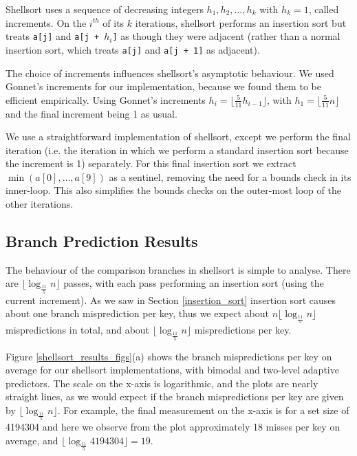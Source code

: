 \documentclass[acmtocl]{acmtrans2m}
\begin{document}
Shellsort uses a sequence of decreasing integers $h_1, h_2, \ldots, h_k$ with
$h_k = 1$, called increments.  On the $i^{th}$ of its $k$ iterations, shellsort
performs an insertion sort but treats \texttt{a[j]} and \texttt{a[j + $h_i$]} as
though they were adjacent (rather than a normal insertion sort, which treats
\texttt{a[j]} and \texttt{a[j + 1]} as adjacent). 

The choice of increments influences shellsort's asymptotic behaviour.  We used
Gonnet's increments \cite{Gonnet+91} for our implementation, because we found
them to be efficient empirically. Using Gonnet's increments $h_i = \lfloor
\frac{5}{11} h_{i - 1} \rfloor$, with $h_1 = \lfloor \frac{5}{11}n \rfloor$ and
the final increment being 1 as usual.

We use a straightforward implementation of shellsort, except we perform the
final iteration (i.e. the iteration in which we perform a standard insertion
sort because the increment is 1) separately.  For this final insertion sort we
extract $\min(a[0], \ldots, a[9])$ as a sentinel, removing the need for a bounds
check in its inner-loop. This also simplifies the bounds checks on the
outer-most loop of the other iterations.

\subsection{Branch Prediction Results}

The behaviour of the comparison branches in shellsort is simple to analyse.
There are $\lfloor \log_\frac{11}{5} n \rfloor$ passes, with each pass
performing an insertion sort (using the current increment). As we saw in Section
\ref{insertion_sort} insertion sort causes about one branch misprediction per
key, thus we expect about $n \lfloor \log_\frac{11}{5}n \rfloor$ mispredictions
in total, and about $\lfloor \log_\frac{11}{5}n \rfloor$ mispredictions per key. 

Figure \ref{shellsort_results_figs}(a) shows the branch mispredictions per key
on average for our shellsort implementations, with bimodal and two-level
adaptive predictors.  The scale on the x-axis is logarithmic, and the plots are
nearly straight lines, as we would expect if the branch mispredictions per key
are given by $\lfloor \log_\frac{11}{5} n \rfloor$. For example, the final
measurement on the x-axis is for a set size of 4194304 and here we observe from
the plot approximately 18 misses per key on average, and 
$\lfloor \log_\frac{11}{5} 4194304 \rfloor = 19$.
\end{document}
